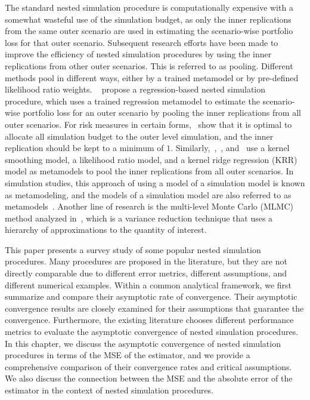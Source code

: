 The standard nested simulation procedure is computationally expensive with a somewhat wasteful use of the simulation budget, as only the inner replications from the same outer scenario are used in estimating the scenario-wise portfolio loss for that outer scenario. 
Subsequent research efforts have been made to improve the efficiency of nested simulation procedures by using the inner replications from other outer scenarios. 
This is referred to as pooling. 
Different methods pool in different ways, either by a trained metamodel or by pre-defined likelihood ratio weights.
~\cite{broadie2015risk} propose a regression-based nested simulation procedure, which uses a trained regression metamodel to estimate the scenario-wise portfolio loss for an outer scenario by pooling the inner replications from all outer scenarios.
For risk measures in certain forms,~\cite{broadie2015risk} show that it is optimal to allocate all simulation budget to the outer level simulation, and the inner replication should be kept to a minimum of $1$.
Similarly,~\cite{hong2017kernel},~\cite{feng2020optimal}, and~\cite{zhang2022sample} use a kernel smoothing model, a likelihood ratio model, and a kernel ridge regression (KRR) model as metamodels to pool the inner replications from all outer scenarios.
In simulation studies, this approach of using a model of a simulation model is known as metamodeling, and the models of a simulation model are also referred to as metamodels~\citep{barton1998simulation}.
Another line of research is the multi-level Monte Carlo (MLMC) method analyzed in~\cite{giles2019multilevel}, which is a variance reduction technique that uses a hierarchy of approximations to the quantity of interest.

This paper presents a survey study of some popular nested simulation procedures. 
Many procedures are proposed in the literature, but they are not directly comparable due to different error metrics, different assumptions, and different numerical examples.
Within a common analytical framework, we first summarize and compare their asymptotic rate of convergence.
Their asymptotic convergence results are closely examined for their assumptions that guarantee the convergence.
Furthermore, the existing literature chooses different performance metrics to evaluate the asymptotic convergence of nested simulation procedures.
In this chapter, we discuss the asymptotic convergence of nested simulation procedures in terms of the MSE of the estimator, and we provide a comprehensive comparison of their convergence rates and critical assumptions.
We also discuss the connection between the MSE and the absolute error of the estimator in the context of nested simulation procedures.

